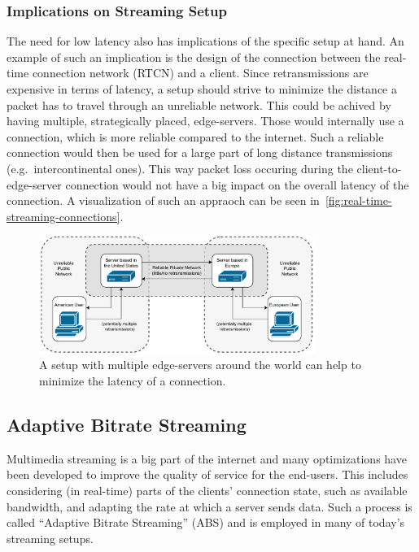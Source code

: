 \subsubsection{Implications on Streaming Setup}
The need for low latency also has implications of the specific setup at hand.
An example of such an implication is the design of the connection between the 
real-time connection network (RTCN) and a client.
Since retransmissions are expensive in terms of latency, a setup should strive to minimize 
the distance a packet has to travel through an unreliable network.
This could be achived by having multiple, strategically placed, edge-servers.
Those would internally use a connection, which is more reliable compared to the internet.
Such a reliable connection would then be used for a large part of long distance transmissions
(e.g.~intercontinental ones).
This way packet loss occuring during the client-to-edge-server connection would not have a big 
impact on the overall latency of the connection.
A visualization of such an appraoch can be seen in~\autoref{fig:real-time-streaming-connections}.

\vspace{0.5cm}
\begin{figure}[H]
    \centering
    \includegraphics[width=0.8\textwidth]{figures/02_background/real-time-streaming-connections.drawio.pdf}
    \caption[Real-time streaming connections]{A setup with multiple edge-servers around the world
    can help to minimize the latency of a connection.}\label{fig:real-time-streaming-connections}
\end{figure}

\subsection{Adaptive Bitrate Streaming}\label{subsec:adaptive_bitrate_streaming}
Multimedia streaming is a big part of the internet and many optimizations have
been developed to improve the quality of service for the end-users.
This includes considering (in real-time) parts of the clients' connection state, 
such as available bandwidth, and adapting the rate at which a server sends data.
Such a process is called ``Adaptive Bitrate Streaming'' (ABS) and is employed in many 
of today's streaming setups.

